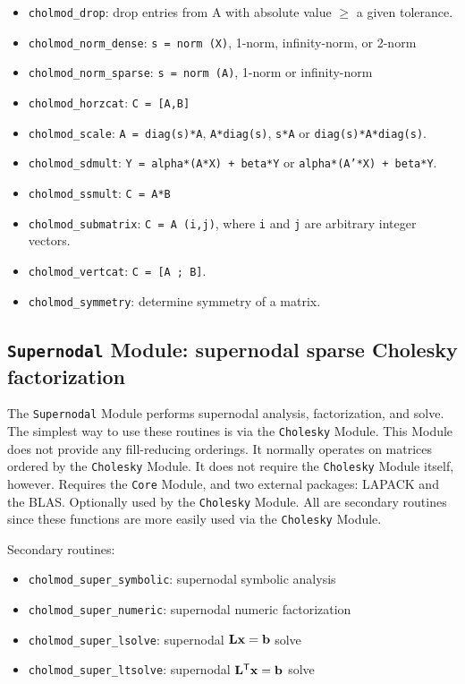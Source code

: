 \documentclass[11pt]{article}
\newcommand{\m}[1]{{\bf{#1}}}       %
\newcommand{\tr}{^{\sf T}}          %
\begin{document}
    \begin{itemize}
    \item {\tt cholmod\_drop}: drop entries from A with absolute value $\ge$ a given tolerance.
    \item {\tt cholmod\_norm\_dense}: {\tt s = norm (X)}, 1-norm, infinity-norm, or 2-norm
    \item {\tt cholmod\_norm\_sparse}: {\tt s = norm (A)}, 1-norm or infinity-norm
    \item {\tt cholmod\_horzcat}: {\tt C = [A,B]}
    \item {\tt cholmod\_scale}: {\tt A = diag(s)*A}, {\tt A*diag(s)}, {\tt s*A} or {\tt diag(s)*A*diag(s)}.
    \item {\tt cholmod\_sdmult}: {\tt Y = alpha*(A*X) + beta*Y} or {\tt alpha*(A'*X) + beta*Y}.
    \item {\tt cholmod\_ssmult}: {\tt C = A*B}
    \item {\tt cholmod\_submatrix}: {\tt C = A (i,j)}, where {\tt i} and {\tt j} are arbitrary integer vectors.
    \item {\tt cholmod\_vertcat}: {\tt C = [A ; B]}.
    \item {\tt cholmod\_symmetry}: determine symmetry of a matrix.
    \end{itemize}

\newpage \subsection{{\tt Supernodal} Module: supernodal sparse Cholesky factorization}

The {\tt Supernodal} Module performs
supernodal analysis, factorization, and solve.  The simplest way to use
these routines is via the {\tt Cholesky} Module.  This Module does not provide any
fill-reducing orderings.  It normally operates on matrices ordered by the
{\tt Cholesky} Module.
It does not require the {\tt Cholesky} Module itself, however.
Requires the {\tt Core} Module, and two external packages: LAPACK and the BLAS.
Optionally used by the {\tt Cholesky} Module.  All are secondary routines
since these functions are more easily used via the {\tt Cholesky} Module.

\vspace{0.1in}
\noindent Secondary routines:
    \begin{itemize}
    \item {\tt cholmod\_super\_symbolic}: supernodal symbolic analysis
    \item {\tt cholmod\_super\_numeric}: supernodal numeric factorization
    \item {\tt cholmod\_super\_lsolve}: supernodal $\m{Lx}=\m{b}$ solve
    \item {\tt cholmod\_super\_ltsolve}: supernodal $\m{L}\tr\m{x}=\m{b}$ solve
    \end{itemize}
\end{document}
